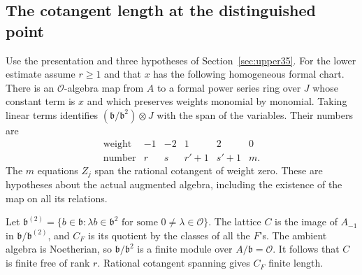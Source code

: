 \documentclass[a4paper,11pt]{article}
\theoremstyle{definition}
\theoremstyle{remark}
\numberwithin{equation}{section}
\newcommand{\OO}{\mathcal O}
\begin{document}
\subsection{The cotangent length at the distinguished point}\label{nav:IV-08}
\label{sec:lower36}

Use the presentation and three hypotheses of Section~\ref{sec:upper35}. For the lower estimate assume \(r\ge1\) and that \(x\) has the following homogeneous formal chart. There is an \(\OO\)-algebra map from \(A\) to a formal power series ring over \(J\) whose constant term is \(x\) and which preserves weights monomial by monomial. Taking linear terms identifies \((\mathfrak b/\mathfrak b^2)\otimes J\) with the span of the variables. Their numbers are
\[
 \begin{array}{c|rrrrr}
 \text{weight}&-1&-2&1&2&0\\ \text{number}&r&s&r'+1&s'+1&m .
 \end{array}
\]
The \(m\) equations \(Z_j\) span the rational cotangent of weight zero. These are hypotheses about the actual augmented algebra, including the existence of the map on all its relations.

Let \(\mathfrak b^{(2)}=\{b\in\mathfrak b:\lambda b\in\mathfrak b^2\text{ for some }0\ne\lambda\in\OO\}\). The lattice \(C\) is the image of \(A_{-1}\) in \(\mathfrak b/\mathfrak b^{(2)}\), and \(C_F\) is its quotient by the classes of all the \(F\)'s. The ambient algebra is Noetherian, so \(\mathfrak b/\mathfrak b^2\) is a finite module over \(A/\mathfrak b=\OO\). It follows that \(C\) is finite free of rank \(r\). Rational cotangent spanning gives \(C_F\) finite length.
\end{document}
